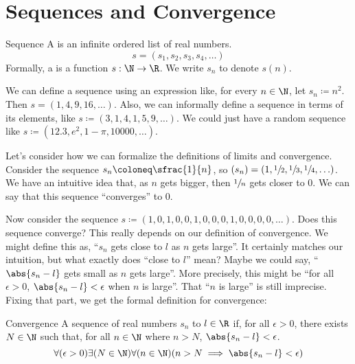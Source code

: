 \chapter{Sequences and Convergence} \label{chapter-sequences}

\begin{dfnbox}{Sequence}{}
    A  is an infinite ordered list of real numbers.
    \[ s = (s_1, s_2, s_3, s_4, \ldots) \]
    \tcblower
    Formally, a  is a function $s : \N \to \R$. We write $s_n$ to denote $s(n)$.
\end{dfnbox}

We can define a sequence using an expression like, for every $n \in \N$, let $s_n \coloneq n^2$. Then $s = (1,4,9,16,\ldots)$. Also, we can informally define a sequence in terms of its elements, like $s \coloneq (3,1,4,1,5,9,\ldots)$. We could just have a random sequence like $s \coloneq (12.3, e^2, 1 - \pi, 10000, \ldots)$.

Let's consider how we can formalize the definitions of limits and convergence. Consider the sequence $s_n \coloneq \sfrac{1}{n}$, so $(s_n) = \left( 1, \sfrac12, \sfrac13, \sfrac14, \ldots \right)$. We have an intuitive idea that, as $n$ gets bigger, then $\sfrac{1}{n}$ gets closer to $0$. We can say that this sequence ``converges'' to $0$.

Now consider the sequence $s \coloneq (1,0,1,0,0,1,0,0,0,1,0,0,0,0,\ldots)$. Does this sequence converge? This really depends on our definition of convergence. We might define this as, ``$s_n$ gets close to $l$ as $n$ gets large''. It certainly matches our intuition, but what exactly does ``close to $l$'' mean? Maybe we could say, ``$\abs{s_n - l}$ gets small as $n$ gets large''. More precisely, this might be ``for all $\epsilon > 0$, $\abs{s_n -l} < \epsilon$ when $n$ is large''. That ``$n$ is large'' is still imprecise. Fixing that part, we get the formal definition for convergence:

\begin{dfnbox}{Convergence}{}
    A sequence of real numbers $s_n$  to $l \in \R$ if, for all $\epsilon > 0$, there exists $N \in \N$ such that, for all $n \in \N$ where $n > N$, $\abs{s_n - l} < \epsilon$.
    \tcblower
    \[ \forall(\epsilon > 0) \exists(N \in \N) \forall (n \in \N) (n > N \implies \abs{s_n - l} < \epsilon) \]
\end{dfnbox}

